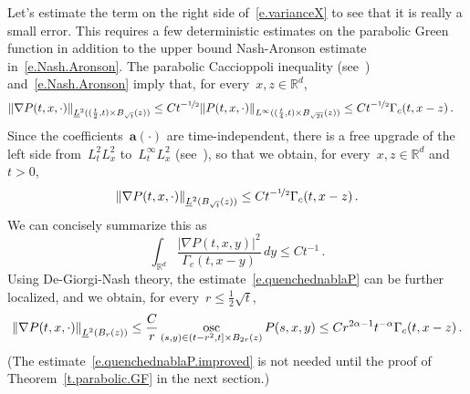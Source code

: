 \documentclass[11pt,twoside]{article} %
\numberwithin{equation}{section}
\theoremstyle{definition}
\let\originalleft\left
\let\originalright\right
\renewcommand{\left}{\mathopen{}\mathclose\bgroup\originalleft}
\renewcommand{\right}{\aftergroup\egroup\originalright}
\newcommand*{\Rd}{\ensuremath{\mathbb{R}^d}}
\renewcommand{\a}{\mathbf{a}}
\DeclareMathOperator*{\osc}{osc}
\begin{document}
Let's estimate the term on the right side of~\eqref{e.varianceX} to see that it is really a small error. 
This requires a few deterministic estimates on the parabolic Green function in addition to the upper bound Nash-Aronson estimate in~\eqref{e.Nash.Aronson}.
The parabolic Caccioppoli inequality (see~\cite[Lemma 8.1]{AKMBook}) and~\eqref{e.Nash.Aronson} imply that, for every~$x,z\in\Rd$, 
\begin{align*}
\left\| \nabla P(t,x,\cdot) \right\|_{\underline{L}^2((\frac t2,t) \times B_{\sqrt{t}}(z))}
&
\leq 
Ct^{-\nicefrac12} 
\left\| P(t,x,\cdot) \right\|_{L^\infty((\frac t4,t)\times B_{\sqrt{2t}}(z))}
\leq
C t^{-\nicefrac12}  \Gamma_c (t,x-z) 
\,.
\end{align*}
Since the coefficients~$\a(\cdot)$ are time-independent, there is a free upgrade of the left side from~$L^2_tL^2_x$ to~$L^\infty_tL^2_x$ (see~\cite[Lemma 8.2]{AKMBook}), so that we obtain, for every~$x,z\in\Rd$ and~$t>0$, 
\begin{equation}
\label{e.quenchednablaP}
\left\| \nabla P(t,x,\cdot) \right\|_{\underline{L}^2(B_{\sqrt{t}}(z))}
\leq
C t^{-\nicefrac12}  \Gamma_c (t,x-z) 
\,.
\end{equation}
We can concisely summarize this as 
\begin{equation}
\label{e.concise.nablaGF}
\int_{\Rd} 
\frac{\bigl| \nabla P(t,x,y) \bigr|^2}
{ \Gamma_c(t,x-y) }
\, dy
\leq Ct^{-1} 
\,.
\end{equation}
Using De-Giorgi-Nash theory, the estimate~\eqref{e.quenchednablaP} can be further localized, and we obtain, for every~$r \leq \frac12 \sqrt{t}$, 
\begin{equation}
\label{e.quenchednablaP.improved}
\left\| \nabla P(t,x,\cdot) \right\|_{\underline{L}^2(B_{r}(z))}
\leq
\frac{C}{r} \osc_{(s,y)\in (t-r^2,t]\times B_{2r}(z)} P(s,x,y) 
\leq C r^{2\alpha -1} t^{-\alpha} \Gamma_c (t,x-z) 
\,.
\end{equation}
(The estimate~\eqref{e.quenchednablaP.improved} is not needed until the proof of Theorem~\ref{t.parabolic.GF} in the next section.)

\smallskip
\end{document}

